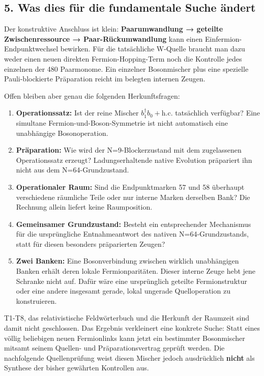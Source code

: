 \subsection{5. Was dies für die fundamentale Suche
ändert}\label{was-dies-fuxfcr-die-fundamentale-suche-uxe4ndert}

Der konstruktive Anschluss ist klein: \textbf{Paarumwandlung → geteilte
Zwischenressource → Paar-Rückumwandlung} kann einen
Einfermion-Endpunktwechsel bewirken. Für die tatsächliche W-Quelle
braucht man dazu weder einen neuen direkten Fermion-Hopping-Term noch
die Kontrolle jedes einzelnen der 480 Paarmonome. Ein einzelner
Bosonmischer plus eine spezielle Pauli-blockierte Präparation reicht im
belegten internen Zeugen.

Offen bleiben aber genau die folgenden Herkunftsfragen:

\begin{enumerate}
\def\labelenumi{\arabic{enumi}.}
\tightlist
\item
  \textbf{Operationssatz:} Ist der reine Mischer
  \(b_1^\dagger b_0+\mathrm{h.c.}\) tatsächlich verfügbar? Eine
  simultane Fermion-und-Boson-Symmetrie ist nicht automatisch eine
  unabhängige Bosonoperation.
\item
  \textbf{Präparation:} Wie wird der N=9-Blockerzustand mit dem
  zugelassenen Operationssatz erzeugt? Ladungserhaltende native
  Evolution präpariert ihn nicht aus dem N=64-Grundzustand.
\item
  \textbf{Operationaler Raum:} Sind die Endpunktmarken 57 und 58
  überhaupt verschiedene räumliche Teile oder nur interne Marken
  derselben Bank? Die Rechnung allein liefert keine Raumposition.
\item
  \textbf{Gemeinsamer Grundzustand:} Besteht ein entsprechender
  Mechanismus für die ursprüngliche Entnahmeantwort des nativen
  N=64-Grundzustands, statt für diesen besonders präparierten Zeugen?
\item
  \textbf{Zwei Banken:} Eine Bosonverbindung zwischen wirklich
  unabhängigen Banken erhält deren lokale Fermionparitäten. Dieser
  interne Zeuge hebt jene Schranke nicht auf. Dafür wäre eine
  ursprünglich geteilte Fermionstruktur oder eine andere insgesamt
  gerade, lokal ungerade Quelloperation zu konstruieren.
\end{enumerate}

T1-T8, das relativistische Feldwörterbuch und die Herkunft der Raumzeit
sind damit nicht geschlossen. Das Ergebnis verkleinert eine konkrete
Suche: Statt eines völlig beliebigen neuen Fermionlinks kann jetzt ein
bestimmter Bosonmischer mitsamt seinem Quellen- und Präparationsvertrag
geprüft werden. Die nachfolgende Quellenprüfung weist diesen Mischer
jedoch ausdrücklich \textbf{nicht} als Synthese der bisher gewährten
Kontrollen aus.

